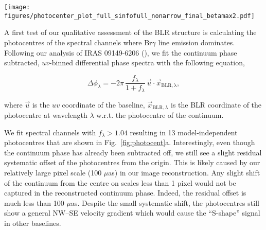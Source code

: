 \documentclass[longauth,]{aa}
\newcommand{\brg}{Br$\gamma$}
\newcommand{\uas}{{\mbox{$\mu$as}}}
\begin{document}
\begin{figure*}
    \centering
    \texttt{[image: figures/photocenter\_plot\_full\_sinfofull\_nonarrow\_final\_betamax2.pdf]}
    \caption{(a) Best fit photocentres for the 13 brightest spectral channels covering the \brg{} line to the differential phase data. The colour indicates wavelength and the ellipses outline the uncertainty on the photocentres. The red cross plots the (0,0) position. (b) Best fit ``2-pole'' photocentre model where all blueshifted (blue point) and redshifted (red point) channels are assumed to have the same photocentre with the addition of the wavelength independent offset. The black point indicates the best fit position of the ``null'' model where all channels are assumed to have the same photocentre. (c) Photocentres produced from our best fitting BLR model (see Section~\ref{sec:blr_model}) which we calculated by first producing mock differential phase spectra and fit them in the same way as panel (a). Colours are the same as in panel (a).}
    \label{fig:photocent}
\end{figure*}

A first test of our qualitative assessment of the BLR structure is calculating the photocentres of the spectral channels where \brg{} line emission dominates. Following our analysis of IRAS 09149-6206 (), we fit the continuum phase subtracted, $uv$-binned differential phase spectra with the following equation,

\begin{equation}\label{eq:diff_phase_photocent}
\Delta \phi_\lambda = -2\pi\, \frac{f_\lambda}{1 + f_\lambda}\, 
\vec{u} \cdot \vec{x}_\mathrm{BLR,\lambda},
\end{equation}

\noindent where $\vec{u}$ is the 
$uv$ coordinate of the baseline, $\vec{x}_{\mathrm{BLR},\lambda}$ is the 
BLR coordinate of the photocentre at wavelength $\lambda$ w.r.t. the photocentre of the continuum.

We fit spectral channels with $f_\lambda > 1.04$ resulting in 13 model-independent photocentres that are shown in Fig.~\ref{fig:photocent}a. Interestingly, even though the continuum phase has already been subtracted off, we still see a slight residual systematic offset of the photocentres from the origin. This is likely caused by our relatively large pixel scale (100 \uas{}) in our image reconstruction. Any slight shift of the continuum from the centre on scales less than 1 pixel would not be captured in the reconstructed continuum phase. Indeed, the residual offset is much less than 100 \uas{}.  
Despite the small systematic shift, the photocentres still show a general NW--SE velocity gradient which would cause the ``S-shape'' signal in other baselines. 
\end{document}
